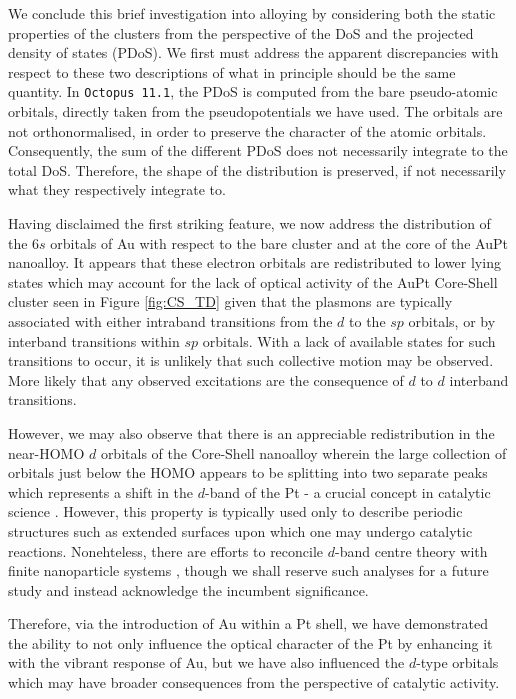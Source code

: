 We conclude this brief investigation into alloying by considering both the static properties of the clusters from the perspective of the DoS and the projected density of states (PDoS). We first must address the apparent discrepancies with respect to these two descriptions of what in principle should be the same quantity. In \texttt{Octopus 11.1}, the PDoS is computed from the bare pseudo-atomic orbitals, directly taken from the pseudopotentials we have used. The orbitals are not orthonormalised, in order to preserve the character of the atomic orbitals. Consequently, the sum of the different PDoS does not necessarily integrate to the total DoS. Therefore, the shape of the distribution is preserved, if not necessarily what they respectively integrate to. 

Having disclaimed the first striking feature, we now address the distribution of the 6$s$ orbitals of Au with respect to the bare cluster and at the core of the AuPt nanoalloy. It appears that these electron orbitals are redistributed to lower lying states which may account for the lack of optical activity of the AuPt Core-Shell cluster seen in Figure \ref{fig:CS_TD} given that the plasmons are typically associated with either intraband transitions from the $d$ to the $sp$ orbitals, or by interband transitions within $sp$ orbitals. With a lack of available states for such transitions to occur, it is unlikely that such collective motion may be observed. More likely that any observed excitations are the consequence of $d$ to $d$ interband transitions.

However, we may also observe that there is an appreciable redistribution in the near-HOMO $d$ orbitals of the Core-Shell nanoalloy wherein the large collection of orbitals just below the HOMO appears to be splitting into two separate peaks which represents a shift in the $d$-band of the Pt - a crucial concept in catalytic science \cite{Nrskov2011,Nrskov2009,Ruban1997}. However, this property is typically used only to describe periodic structures such as extended surfaces upon which one may undergo catalytic reactions. Nonehteless, there are efforts to reconcile $d$-band centre theory with finite nanoparticle systems \cite{Gorzkowski2015}, though we shall reserve such analyses for a future study and instead acknowledge the incumbent significance. 

Therefore, via the introduction of Au within a Pt shell, we have demonstrated the ability to not only influence the optical character of the Pt by enhancing it with the vibrant response of Au, but we have also influenced the $d$-type orbitals which may have broader consequences from the perspective of catalytic activity. 


